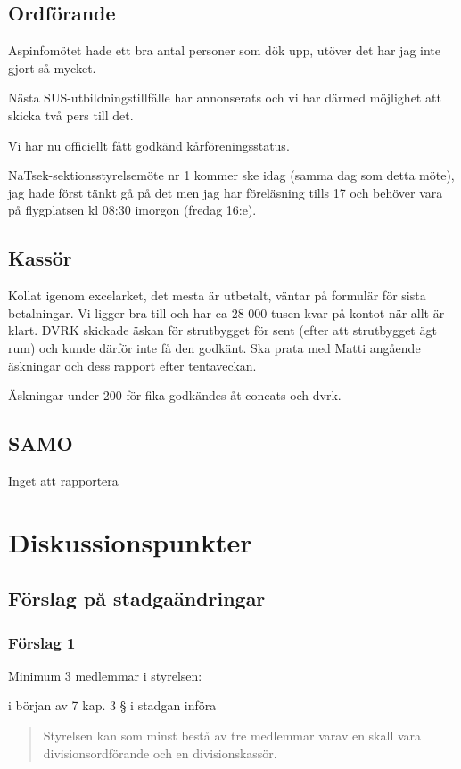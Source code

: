 \documentclass[protokoll]{dvd}
\begin{document}
\subsection{Ordförande}
Aspinfomötet hade ett bra antal personer som dök upp, utöver det har jag inte gjort så mycket.


Nästa SUS-utbildningstillfälle har annonserats och vi har därmed möjlighet att skicka två pers till det. 

Vi har nu officiellt fått godkänd kårföreningsstatus. 

NaTsek-sektionsstyrelsemöte nr 1 kommer ske idag (samma dag som detta möte), jag hade först tänkt gå på det men jag har föreläsning tills 17 och behöver vara på flygplatsen kl 08:30 imorgon (fredag 16:e). 

\subsection{Kassör}
Kollat igenom excelarket, det mesta är utbetalt, väntar på formulär för sista betalningar. Vi ligger bra till och har ca 28 000 tusen kvar på kontot när allt är klart. DVRK
skickade äskan för strutbygget för sent (efter att strutbygget ägt rum) och kunde därför inte få
den godkänt. Ska prata med Matti angående äskningar och dess rapport efter tentaveckan.

Äskningar under 200 för fika godkändes åt concats och dvrk.

\subsection{SAMO}
Inget att rapportera

\newpage


\section{Diskussionspunkter}
\subsection*{Förslag på stadgaändringar}

\subsubsection*{Förslag 1}
Minimum 3 medlemmar i styrelsen: 
\begin{attsatser}
    \item i början av 7 kap. 3 § i stadgan införa 
    \begin{quote}
        Styrelsen kan som minst bestå av tre medlemmar varav en skall vara divisionsordförande och en divisionskassör. 
    \end{quote}
\end{attsatser}
\end{document}
